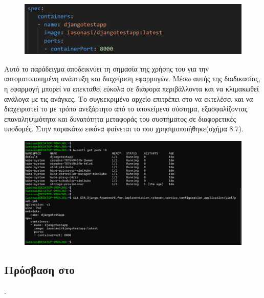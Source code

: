 \FloatBarrier

\begin{figure}[h]
	\centering
	\includegraphics[width=1.5\textwidth]{graphics/pod_spec.png}
	\caption{}
\end{figure}

\FloatBarrier

Αυτό το παράδειγμα αποδεικνύει τη σημασία της χρήσης του  
για την αυτοματοποιημένη ανάπτυξη και διαχείριση  
εφαρμογών. Μέσω αυτής της διαδικασίας, η εφαρμογή μπορεί να 
επεκταθεί εύκολα σε διάφορα περιβάλλοντα και να κλιμακωθεί 
ανάλογα με τις ανάγκες. Το συγκεκριμένο αρχείο  
επιτρέπει στο  να εκτελέσει και να διαχειριστεί το 
 με τρόπο ανεξάρτητο από το υποκείμενο σύστημα, 
εξασφαλίζοντας επαναληψιμότητα και δυνατότητα μεταφοράς του 
συστήματος σε διαφορετικές υποδομές. Στην παρακάτω εικόνα φαίνεται το 
 που χρησιμοποιήθηκε(σχήμα 8.7). 

\FloatBarrier

\begin{figure}[h]
	\centering
	\includegraphics[width=1.5\textwidth]{graphics/deploy_django.png}
	\caption{}
\end{figure}

\FloatBarrier

\subsection{Πρόσβαση στο }.


